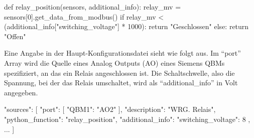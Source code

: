 \begin{pythoncode}
def relay_position(sensors, additional_info):
	relay_mv = sensors[0].get_data_from_modbus()
	if relay_mv < (additional_info["switching_voltage"] * 1000):
		return "Geschlossen"
	else:
		return "Offen"

\end{pythoncode}

Eine Angabe in der Haupt-Konfigurationsdatei sieht wie folgt aus. Im \enquote{port} Array wird die Quelle eines Analog Outputs (AO) eines Siemens QBMs spezifiziert, an das ein Relais angeschlossen ist. Die Schaltschwelle, also die Spannung, bei der das Relais umschaltet, wird als \enquote{additional\_info} in Volt angegeben.

\begin{jsoncode}
"sources": [
	{
		"port": [
			{"QBM1": "AO2"}
		],
		"description": "WRG. Relais",
		"python_function": "relay_position",
		"additional_info": {"switching_voltage": 8}
	},
	...
]
\end{jsoncode}